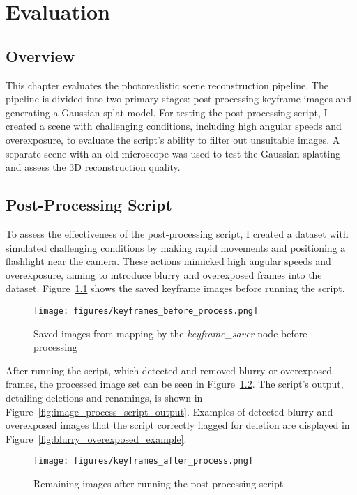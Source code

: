 \chapter{Evaluation} \label{evaluation}

\section{Overview}
This chapter evaluates the photorealistic scene reconstruction pipeline. The pipeline is divided into two primary stages: post-processing keyframe images and generating a Gaussian splat model. For testing the post-processing script, I created a scene with challenging conditions, including high angular speeds and overexposure, to evaluate the script's ability to filter out unsuitable images. A separate scene with an old microscope was used to test the Gaussian splatting and assess the 3D reconstruction quality. 

\section{Post-Processing Script}
To assess the effectiveness of the post-processing script, I created a dataset with simulated challenging conditions by making rapid movements and positioning a flashlight near the camera. These actions mimicked high angular speeds and overexposure, aiming to introduce blurry and overexposed frames into the dataset. Figure~\ref{fig:keyframes_before_process} shows the saved keyframe images before running the script.

\FloatBarrier
\begin{figure}[htbp]
	\centering
	\texttt{[image: figures/keyframes\_before\_process.png]}
	\caption{Saved images from mapping by the \textit{keyframe\_saver} node before processing}
	\label{fig:keyframes_before_process}
\end{figure}
\FloatBarrier

After running the script, which detected and removed blurry or overexposed frames, the processed image set can be seen in Figure~\ref{fig:keyframes_after_process}. The script’s output, detailing deletions and renamings, is shown in Figure~\ref{fig:image_process_script_output}. Examples of detected blurry and overexposed images that the script correctly flagged for deletion are displayed in Figure~\ref{fig:blurry_overexposed_example}.

\FloatBarrier
\begin{figure}[htbp]
	\centering
	\texttt{[image: figures/keyframes\_after\_process.png]}
	\caption{Remaining images after running the post-processing script}
	\label{fig:keyframes_after_process}
\end{figure}

